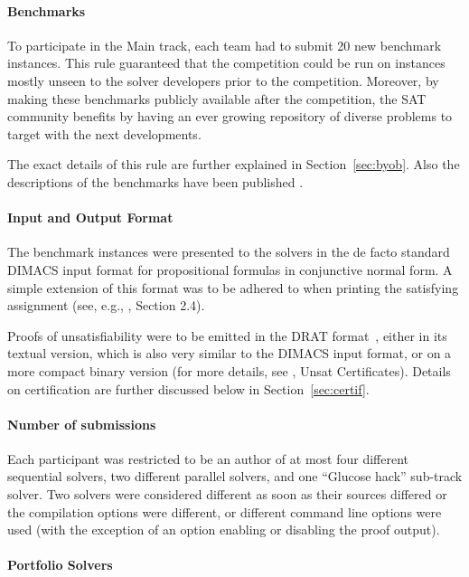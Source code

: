 \documentclass{elsarticle}
\begin{document}
\paragraph{Benchmarks}
To participate in the Main track, each team had to submit 20 new benchmark instances.
This rule guaranteed that the competition could be run on instances mostly unseen to the solver
developers prior to the competition. Moreover, by making these benchmarks publicly available
after the competition, the SAT community benefits by having an ever growing repository 
of diverse problems to target with the next developments.

The exact details of this rule are further explained in Section~\ref{sec:byob}.
Also the descriptions of the benchmarks have been published \cite{SC2020}.

\paragraph{Input and Output Format}

The benchmark instances were presented to the solvers in the de facto standard
DIMACS input format for propositional formulas in conjunctive normal form.
A simple extension of this format was to be adhered to when printing 
the satisfying assignment 
(see, e.g., \cite{DBLP:journals/jsat/HeuleJS19}, Section 2.4).

Proofs of unsatisfiability were to be emitted in the DRAT format~\cite{DRATtrim},
either in its textual version, which is also very similar to the DIMACS input format,
or on a more compact binary version (for more details, see \cite{satComp2020www}, Unsat Certificates).
%
Details on certification are further discussed below in Section~\ref{sec:certif}.

\paragraph{Number of submissions}

Each participant was restricted to be an author of at most four different sequential solvers,
two different parallel solvers, and one ``Glucose hack'' sub-track solver.
Two solvers were considered different as soon as their sources differed
or the compilation options were different, or different command line options were used
(with the exception of an option enabling or disabling the proof output).

\paragraph{Portfolio Solvers}
\end{document}
